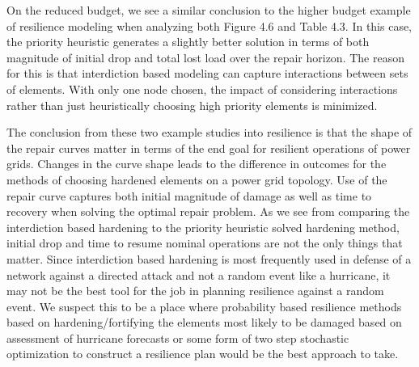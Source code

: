 On the reduced budget, we see a similar conclusion to the higher budget example of resilience modeling when analyzing both Figure 4.6 and Table 4.3. In this case, the priority heuristic generates a slightly better solution in terms of both magnitude of initial drop and total lost load over the repair horizon. The reason for this is that interdiction based modeling can capture interactions between sets of elements. With only one node chosen, the impact of considering interactions rather than just heuristically choosing high priority elements is minimized. 

The conclusion from these two example studies into resilience is that the shape of the repair curves matter in terms of the end goal for resilient operations of power grids.  Changes in the curve shape leads to the difference in outcomes for the methods of choosing hardened elements on a power grid topology. Use of the repair curve captures both initial magnitude of damage as well as time to recovery when solving the optimal repair problem. As we see from comparing the interdiction based hardening to the priority heuristic solved hardening method, initial drop and time to resume nominal operations are not the only things that matter. Since interdiction based hardening is most frequently used in defense of a network against a directed attack and not a random event like a hurricane, it may not be the best tool for the job in planning resilience against a random event. We suspect this to be a place where probability based resilience methods based on hardening/fortifying the elements most likely to be damaged based on assessment of hurricane forecasts or some form of two step stochastic optimization to construct a resilience plan would be the best approach to take. 

